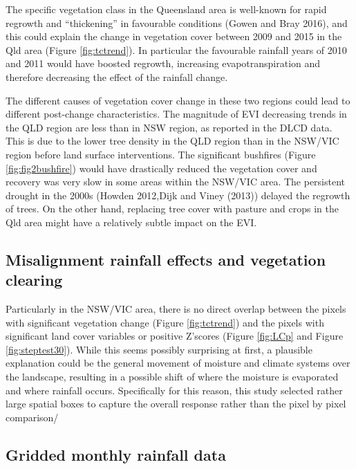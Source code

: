 \documentclass[]{elsarticle} %
\theoremstyle{definition}
\theoremstyle{definition}
\theoremstyle{definition}
\theoremstyle{remark}
\begin{document}
The specific vegetation class in the Queensland area is well-known for
rapid regrowth and ``thickening'' in favourable conditions (Gowen and
Bray 2016), and this could explain the change in vegetation cover
between 2009 and 2015 in the Qld area (Figure \ref{fig:tctrend}). In
particular the favourable rainfall years of 2010 and 2011 would have
boosted regrowth, increasing evapotranspiration and therefore decreasing
the effect of the rainfall change.

The different causes of vegetation cover change in these two regions
could lead to different post-change characteristics. The magnitude of
EVI decreasing trends in the QLD region are less than in NSW region, as
reported in the DLCD data. This is due to the lower tree density in the
QLD region than in the NSW/VIC region before land surface interventions.
The significant bushfires (Figure \ref{fig:fig2bushfire}) would have
drastically reduced the vegetation cover and recovery was very slow in
some areas within the NSW/VIC area. The persistent drought in the 2000s
(Howden 2012,Dijk and Viney (2013)) delayed the regrowth of trees. On
the other hand, replacing tree cover with pasture and crops in the Qld
area might have a relatively subtle impact on the EVI.

\subsection{Misalignment rainfall effects and vegetation
clearing}\label{misalignment-rainfall-effects-and-vegetation-clearing}

Particularly in the NSW/VIC area, there is no direct overlap between the
pixels with significant vegetation change (Figure \ref{fig:tctrend}) and
the pixels with significant land cover variables or positive Z'scores
(Figure \ref{fig:LCp} and Figure \ref{fig:steptest30}). While this seems
possibly surprising at first, a plausible explanation could be the
general movement of moisture and climate systems over the landscape,
resulting in a possible shift of where the moisture is evaporated and
where rainfall occurs. Specifically for this reason, this study selected
rather large spatial boxes to capture the overall response rather than
the pixel by pixel comparison/

\subsection{Gridded monthly rainfall
data}\label{gridded-monthly-rainfall-data}
\end{document}
